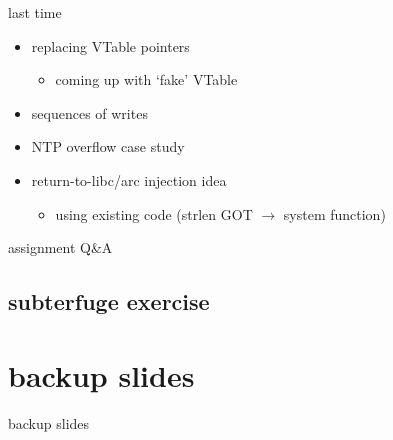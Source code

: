 \date{}
\title{}
\date{}

\begin{frame}
    \titlepage
\end{frame}



\begin{frame}{last time}
    \begin{itemize}
    \item replacing VTable pointers
        \begin{itemize}
        \item coming up with `fake' VTable
        \end{itemize}
    \item sequences of writes
    \item NTP overflow case study
    \item return-to-libc/arc injection idea
        \begin{itemize}
        \item using existing code (strlen GOT $\rightarrow$ system function)
        \end{itemize}
    \end{itemize}
\end{frame}

\begin{frame}{assignment Q\&A}
\end{frame}

\subsection{subterfuge exercise}







\section{backup slides}
\begin{frame}{backup slides}
\end{frame}


